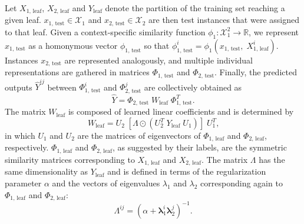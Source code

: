 \documentclass[letterpaper]{article}
\newcommand{\T}{^T}
\newcommand{\x}{\mathbf{x}}
\newcommand{\X}{\mathcal{X}}
\newcommand{\R}{\mathbb{R}}
\begin{document}
Let $X_\text{1, leaf}$, $X_\text{2, leaf}$ and $Y_\text{leaf}$ denote the partition of the training set reaching a given leaf.
$x_\text{1, test} \in \X_1$ and $x_\text{2, test} \in \X_2$ are then test instances that were assigned to that leaf.
Given a context-specific similarity function $\phi_1: \X_1^2 \to \R$, we represent $x_\text{1, test}$ as a homonymous vector $\phi_\text{1, test}$ so that $\phi^i_\text{1, test} = \phi_1(x_\text{1, test},\; X^i_\text{1, leaf})$. 
Instances $x_\text{2, test}$ are represented analogously, and multiple individual representations are gathered in matrices $\Phi_\text{1, test}$ and $\Phi_\text{2, test}$.
%
Finally, the predicted outputs $\hat Y^{ij}$ between $\Phi^i_\text{1, test}$ and $\Phi^j_\text{2, test}$ are collectively obtained as
\begin{equation}
    \label{eq:rlskron output}
    \hat Y = \Phi_\text{2, test} \; W_\text{leaf} \;\Phi\T_\text{1, test}
    \text{.}
\end{equation}
The matrix $W_\text{leaf}$ is composed of learned linear coefficients and is determined by
\begin{equation}
    \label{eq:rlskron w}
    W_\text{leaf} = U_2
    \;[
        \Lambda
        \odot (U_2\T \; Y_\text{leaf} \; U_1)
    ]\;
    U_1\T
    \text{,}
\end{equation}
%
in which $U_1$ and $U_2$ are the matrices of eigenvectors of $\Phi_\text{1, leaf}$ and $\Phi_\text{2, leaf}$, respectively. $\Phi_\text{1, leaf}$ and $\Phi_\text{2, leaf}$, as suggested by their labels, are the symmetric similarity matrices corresponding to $X_\text{1, leaf}$ and $X_\text{2, leaf}$. The matrix $\Lambda$ has the same dimensionality as $Y_\text{leaf}$ and is defined in terms of the regularization parameter $\alpha$ and the vectors of eigenvalues $\lambda_1$ and $\lambda_2$ corresponding again to $\Phi_\text{1, leaf}$ and $\Phi_\text{2, leaf}$:
%
\begin{equation}
    \textstyle
    \Lambda^{ij} = ({\alpha + \mathbf{\lambda}_1^i \mathbf{\lambda}_2^{j}})^{-1}
    \text{.}
\end{equation}

\end{document}
